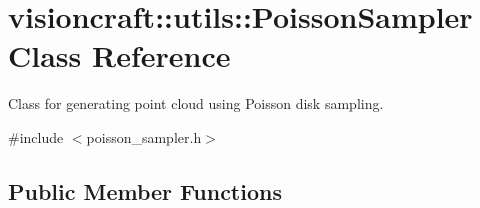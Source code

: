 \hypertarget{classvisioncraft_1_1utils_1_1PoissonSampler}{}\section{visioncraft\+:\+:utils\+:\+:Poisson\+Sampler Class Reference}
\label{classvisioncraft_1_1utils_1_1PoissonSampler}


Class for generating point cloud using Poisson disk sampling.  




{\ttfamily \#include $<$poisson\+\_\+sampler.\+h$>$}

\subsection*{Public Member Functions}
